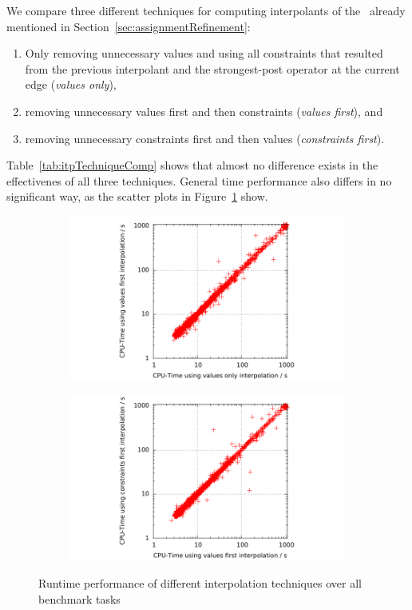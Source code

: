 We compare three different techniques for computing interpolants of the \symbolicExecutionCPA\ already mentioned in Section~\ref{sec:assignmentRefinement}:
\begin{enumerate}[label=\alph*)]
\item Only removing unnecessary values and using all constraints that resulted from the previous interpolant and the strongest-post operator at the current edge (\emph{values only}),
\item removing unnecessary values first and then constraints (\emph{values first}), and
\item removing unnecessary constraints first and then values (\emph{constraints first}).
\end{enumerate}
Table~\ref{tab:itpTechniqueComp} shows that almost no difference exists in the effectivenes of all three techniques.
General time performance also differs in no significant way, as the scatter plots in Figure~\ref{fig:spTimeVOVF} show.
\begin{figure}[t]
\begin{subfigure}[b]{.48\textwidth}
\includegraphics[trim=2cm 0 1cm 0, clip=true, scale=.9]{evaluation/sp_valuesOnly_valuesFirst_cputime}
\end{subfigure}%
\hfill
\begin{subfigure}[b]{.48\textwidth}
\includegraphics[trim=2cm 0 1cm 0, clip=true, scale=.9]{evaluation/sp_valuesFirst_constrFirst_cputime}
\end{subfigure}
\caption{Runtime performance of different interpolation techniques over all benchmark tasks}
\label{fig:spTimeVOVF}
\end{figure}
